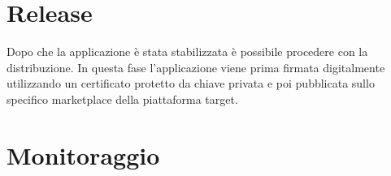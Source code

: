 \section{Release}
Dopo che la applicazione è stata stabilizzata è possibile procedere con la distribuzione. In questa fase l'applicazione viene prima firmata digitalmente utilizzando un certificato protetto da chiave privata e poi pubblicata sullo specifico marketplace della piattaforma target.


\section{Monitoraggio}
